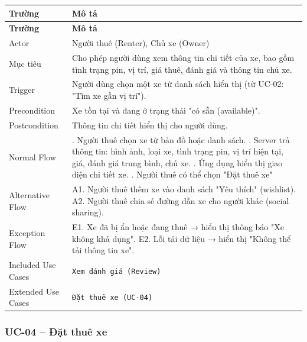 \begin{longtable}{|>{\raggedright\arraybackslash}p{4cm}|>{\raggedright\arraybackslash}p{11cm}|}
\hline
\textbf{Trường} & \textbf{Mô tả} \\
\hline
\endfirsthead

\hline
\textbf{Trường} & \textbf{Mô tả} \\
\hline
\endhead

\hline
\endfoot

Actor & Người thuê (Renter), Chủ xe (Owner) \\
\hline
Mục tiêu & Cho phép người dùng xem thông tin chi tiết của xe, bao gồm tình trạng pin, vị trí, giá thuê, đánh giá và thông tin chủ xe. \\
\hline
Trigger & Người dùng chọn một xe từ danh sách hiển thị (từ UC-02: "Tìm xe gần vị trí"). \\
\hline
Precondition & Xe tồn tại và đang ở trạng thái "có sẵn (available)". \\
\hline
Postcondition & Thông tin chi tiết hiển thị cho người dùng. \\
\hline
Normal Flow & 1. Người thuê chọn xe từ bản đồ hoặc danh sách. \newline 2. Server trả thông tin: hình ảnh, loại xe, tình trạng pin, vị trí hiện tại, giá, đánh giá trung bình, chủ xe. \newline 3. Ứng dụng hiển thị giao diện chi tiết xe. \newline 4. Người thuê có thể chọn "Đặt thuê xe" \\
\hline
Alternative Flow & A1. Người thuê thêm xe vào danh sách "Yêu thích" (wishlist). \newline A2. Người thuê chia sẻ đường dẫn xe cho người khác (social sharing). \\
\hline
Exception Flow & E1. Xe đã bị ẩn hoặc đang thuê → hiển thị thông báo "Xe không khả dụng". \newline E2. Lỗi tải dữ liệu → hiển thị "Không thể tải thông tin xe". \\
\hline
Included Use Cases & \texttt{Xem đánh giá (Review)} \\
\hline
Extended Use Cases & \texttt{Đặt thuê xe (UC-04)} \\
\hline
\end{longtable}

\subsubsection*{UC-04 – Đặt thuê xe}

